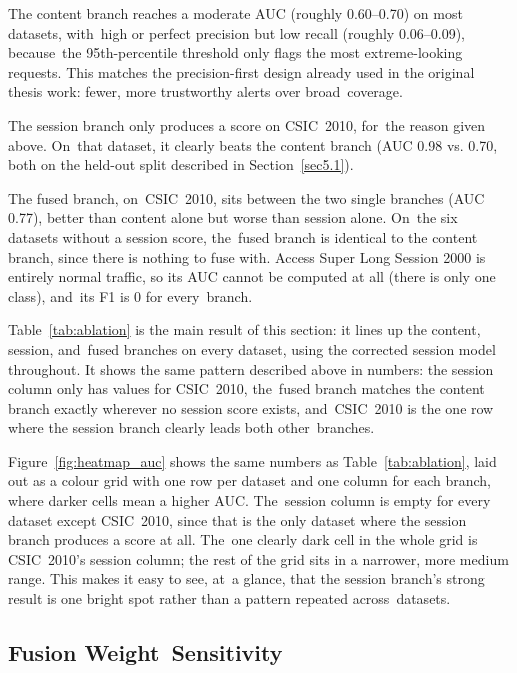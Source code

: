 \documentclass[futureinternet,article,accept,moreauthors]{Definitions/mdpi}
\begin{document}
The content branch reaches a moderate AUC (roughly 0.60--0.70) on most datasets, with~high or perfect precision but low recall (roughly 0.06--0.09), because~the 95th-percentile threshold only flags the most extreme-looking requests. This matches the precision-first design already used in the original thesis work: fewer, more trustworthy alerts over broad~coverage.

The session branch only produces a score on CSIC~2010, for~the reason given above. On~that dataset, it clearly beats the content branch (AUC 0.98 vs. 0.70, both on the held-out split described in Section~\ref{sec5.1}).

The fused branch, on~CSIC~2010, sits between the two single branches (AUC 0.77), better than content alone but worse than session alone. On~the six datasets without a session score, the~fused branch is identical to the content branch, since there is nothing to fuse with. Access Super Long Session 2000 is entirely normal traffic, so its AUC cannot be computed at all (there is only one class), and~its F1 is 0 for every~branch.




Table~\ref{tab:ablation} is the main result of this section: it lines up the content, session, and~fused branches on every dataset, using the corrected session model throughout. It shows the same pattern described above in numbers: the session column only has values for CSIC~2010, the~fused branch matches the content branch exactly wherever no session score exists, and~CSIC~2010 is the one row where the session branch clearly leads both other~branches.



Figure~\ref{fig:heatmap_auc} shows the same numbers as Table~\ref{tab:ablation}, laid out as a colour grid with one row per dataset and one column for each branch, where darker cells mean a higher AUC. The~session column is empty for every dataset except CSIC~2010, since that is the only dataset where the session branch produces a score at all. The~one clearly dark cell in the whole grid is CSIC~2010's session column; the rest of the grid sits in a narrower, more medium range. This makes it easy to see, at~a glance, that the session branch's strong result is one bright spot rather than a pattern repeated across~datasets.

\subsection{Fusion Weight~Sensitivity} \label{sec5.3}
\end{document}
